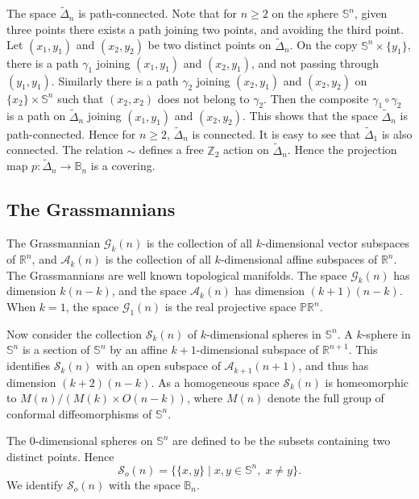 \documentclass[11pt]{amsart}
\theoremstyle{definition}
\theoremstyle{remark}
\numberwithin{equation}{section}
\theoremstyle{plain}
\begin{document}
The space $\tilde \Delta_n$ is  path-connected. Note that for $n \geq 2$ on the sphere ${\mathbb S}^n$,  given three points there exists a path joining two points, and avoiding the third point. Let $(x_1, y_1)$ and $(x_2, y_2)$ be two distinct points on $\tilde \Delta_n$. On the copy ${\mathbb S}^n \times \{y_1\}$, there is a path $\gamma_1$ joining $(x_1, y_1)$ and $(x_2, y_1)$, and not passing through $(y_1, y_1)$. Similarly there is a path $\gamma_2$ joining $(x_2, y_1)$ and $(x_2, y_2)$ on $\{x_2\} \times {\mathbb S}^n$ such that $(x_2, x_2)$ does not belong to $\gamma_2$. Then the composite $\gamma_1 \circ \gamma_2$ is a path on $\tilde \Delta_n$ joining $(x_1, y_1)$ and $(x_2, y_2)$. This shows that the space $\tilde \Delta_n$ is path-connected. Hence for $n \geq 2$, $\tilde \Delta_n$ is connected. It is easy to see that $\tilde \Delta_1$ is also connected. The relation $\sim$ defines a free ${\mathbb Z}_2$ action on $\tilde \Delta_n$. Hence the projection map $p: \tilde \Delta_n \to {\mathbb B}_n$ is a covering. 

\subsection{The Grassmannians}\label{gr}
The Grassmannian ${\mathcal G}_k(n)$ is the collection of all $k$-dimensional vector subspaces of ${\mathbb R}^n$, and ${\mathcal A}_k(n)$ is the collection of all $k$-dimensional affine subspaces of ${\mathbb R}^n$. The Grassmannians are well known topological manifolds. The space ${\mathcal G}_k(n)$ has dimension $k(n-k)$, and the space ${\mathcal A}_k(n)$ has dimension $(k+1)(n-k)$. When $k=1$, the space ${\mathcal G}_1(n)$ is the real projective space ${\mathbb P} {\mathbb R}^n$. 

Now consider the collection $\mathcal S_k(n)$ of  $k$-dimensional spheres in ${\mathbb S}^n$. 
A $k$-sphere in ${\mathbb S}^n$ is a section of ${\mathbb S}^n$ by an affine $k+1$-dimensional subspace of ${\mathbb R}^{n+1}$. This identifies $\mathcal S_k(n)$  with an open subspace of ${\mathcal A}_{k+1}(n+1)$, and thus has dimension $(k+2)(n-k)$. As a homogeneous space $\mathcal S_k(n)$ is homeomorphic to $M(n)/(M(k) \times O(n-k))$, where $M(n)$ denote the full group of conformal diffeomorphisms of ${\mathbb S}^n$.  

The $0$-dimensional spheres on ${\mathbb S}^n$ are defined to be 
the subsets containing two distinct points. Hence 
$$\mathcal S_o(n)=\{ \{x, y\}\;| \; x, y \in {\mathbb S}^n, \; x \neq y\}.$$ 
We identify $\mathcal S_o(n)$ with the space ${\mathbb B}_n$. 
\end{document}
